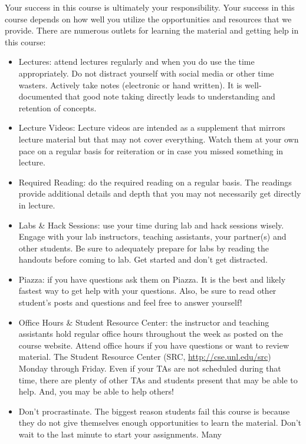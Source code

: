 \documentclass[12pt]{scrartcl}
\begin{document}
Your success in this course is ultimately your responsibility.  Your
success in this course depends on how well you utilize the opportunities
and resources that we provide.  There are numerous outlets for learning
the material and getting help in this course:
\begin{itemize}
  \item Lectures: attend lectures regularly and when you do use the 
  time appropriately.  Do not distract yourself with social media or other
  time wasters.  Actively take notes (electronic or hand written).  It is
  well-documented that good note taking directly leads to understanding and
  retention of concepts.
  \item Lecture Videos: Lecture videos are intended as a supplement
  that mirrors lecture material but that may not cover everything.  Watch
  them at your own pace on a regular basis for reiteration or in case
  you missed something in lecture.  
  \item Required Reading: do the required reading on a regular basis.  The
  readings provide additional details and depth that you may not necessarily
  get directly in lecture.  
  \item Labs \& Hack Sessions: use your time during lab and hack sessions 
  wisely.  Engage with your lab instructors, teaching assistants, your partner(s)
  and other students.  Be sure to adequately prepare for labs by reading
  the handouts before coming to lab.  Get started and don't get distracted.
  \item Piazza: if you have questions ask them on Piazza.  It is the best and
  likely fastest way to get help with your questions.  Also, be sure to read
  other student's posts and questions and feel free to answer yourself!
  \item Office Hours \& Student Resource Center: the instructor and teaching
  assistants hold regular office hours throughout the week as posted on the
  course website.  Attend office hours if you have questions or want to 
  review material.  The Student Resource Center (SRC, \url{http://cse.unl.edu/src})
  Monday through Friday.  Even if your TAs are not scheduled
  during that time, there are plenty of other TAs and students present that
  may be able to help.  And, you may be able to help others!
  \item Don't procrastinate.  The biggest reason students fail this course
  is because they do not give themselves enough opportunities to learn the
  material.  Don't wait to the last minute to start your assignments.  Many

\end{itemize}
\end{document}
